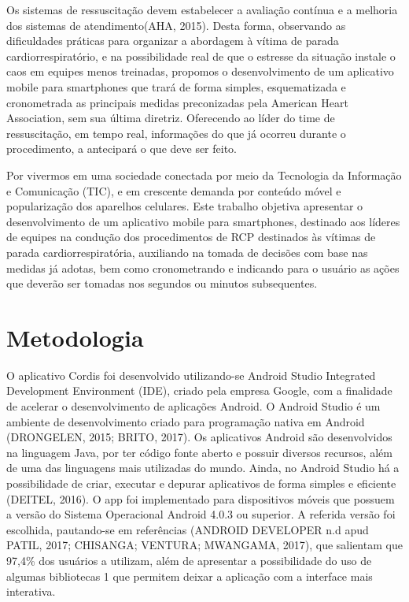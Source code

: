 \documentclass[twoside,twocolumn]{article}
\begin{document}
Os sistemas de ressuscitação devem estabelecer a avaliação contínua e a melhoria dos sistemas de atendimento(AHA, 2015). Desta forma, observando as dificuldades práticas para organizar a abordagem à vítima de parada cardiorrespiratório, e na possibilidade real de que o estresse da situação instale o caos em equipes menos treinadas, propomos o desenvolvimento de um aplicativo mobile para smartphones que trará de forma simples, esquematizada e cronometrada as principais medidas preconizadas pela American Heart Association, sem sua última diretriz. Oferecendo ao líder do time de ressuscitação, em tempo real, informações do que já ocorreu durante o procedimento, a antecipará o que deve ser feito. 

Por vivermos em uma sociedade conectada por meio da Tecnologia da Informação e Comunicação (TIC), e em crescente demanda por conteúdo móvel e popularização dos aparelhos celulares. Este trabalho objetiva apresentar o desenvolvimento de um aplicativo mobile para smartphones, destinado aos líderes de equipes na condução dos procedimentos de RCP destinados às vítimas de parada cardiorrespiratória, auxiliando na tomada de decisões com base nas medidas já adotas, bem como cronometrando e indicando para o usuário as ações que deverão ser tomadas nos segundos ou minutos subsequentes.



\section{Metodologia}

O aplicativo Cordis foi desenvolvido utilizando-se Android Studio Integrated Development Environment (IDE), criado pela empresa Google, com a finalidade de acelerar o desenvolvimento de aplicações Android. O Android Studio é um ambiente de desenvolvimento criado para programação nativa em Android (DRONGELEN, 2015; BRITO, 2017). 
Os aplicativos Android são desenvolvidos na linguagem Java, por ter código fonte aberto e possuir diversos recursos, além de uma das linguagens mais utilizadas do mundo. 
Ainda, no Android Studio há a possibilidade de criar, executar e depurar aplicativos de forma simples e eficiente (DEITEL, 2016).
O app foi implementado para dispositivos móveis que possuem a versão do Sistema Operacional Android 4.0.3 ou superior. A referida versão foi escolhida, pautando-se em referências (ANDROID DEVELOPER n.d apud PATIL, 2017; CHISANGA; VENTURA; MWANGAMA, 2017), que  salientam que 97,4\% dos usuários a utilizam, além de apresentar a possibilidade do uso de  algumas bibliotecas 1 que permitem deixar a aplicação com a interface mais interativa.
\end{document}
